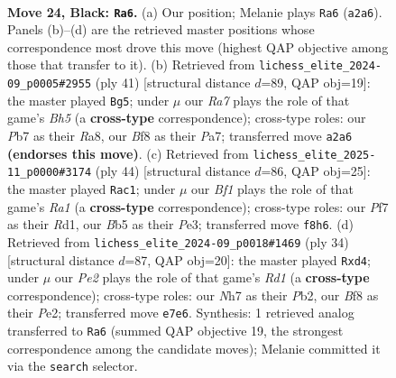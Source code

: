 \documentclass[11pt]{article}
\begin{document}
\begin{figure}[p]\centering
\begin{subfigure}{0.46\textwidth}\centering
\resizebox{\linewidth}{!}{%
\newchessgame
\chessboard[
  setfen={2k2b1r/1p2pp1n/1B1p2p1/1b6/3PP2Q/1P2RP2/r5PP/1K5R b - - 1 24},
  showmover=false,
  pgfstyle=straightmove, color=movearrow, markmove={a2-a6}
]}
\caption{}
\end{subfigure}\hfill
\begin{subfigure}{0.46\textwidth}\centering
\resizebox{\linewidth}{!}{%
\newchessgame
\chessboard[
  setfen={r5k1/pppb1pp1/7p/3p4/7b/2P2QP1/PP3P2/RN2rBK1 b - - 0 21},
  showmover=false,
  pgfstyle=straightmove, color=movearrow, markmove={h4-g5}
]}
\caption{}
\end{subfigure}
\\[4pt]
\begin{subfigure}{0.46\textwidth}\centering
\resizebox{\linewidth}{!}{%
\newchessgame
\chessboard[
  setfen={1r3k1r/5ppp/Q1B1pb2/1p2p3/1Pq5/P3P3/5PKP/R2R4 w - - 2 23},
  showmover=false,
  pgfstyle=straightmove, color=movearrow, markmove={a1-c1}
]}
\caption{}
\end{subfigure}\hfill
\begin{subfigure}{0.46\textwidth}\centering
\resizebox{\linewidth}{!}{%
\newchessgame
\chessboard[
  setfen={r1b2rk1/pp3pp1/2p4p/8/3q4/5BP1/PP2PP1P/R2R2K1 w - - 0 18},
  showmover=false,
  pgfstyle=straightmove, color=movearrow, markmove={d1-d4}
]}
\caption{}
\end{subfigure}
\caption{\textbf{Move 24, Black: \texttt{Ra6}.} (a) Our position; Melanie plays \texttt{Ra6} (\texttt{a2a6}). Panels (b)--(d) are the retrieved master positions whose correspondence most drove this move (highest QAP objective among those that transfer to it). (b) Retrieved from \texttt{lichess\_elite\_2024-09\_p0005\#2955} (ply 41) [structural distance $d$=89, QAP obj=19]: the master played \texttt{Bg5}; under $\mu$ our \emph{Ra7} plays the role of that game's \emph{Bh5} (a \textbf{cross-type} correspondence); cross-type roles: our \emph{P}b7 as their \emph{R}a8, our \emph{B}f8 as their \emph{P}a7; transferred move \texttt{a2a6} \textbf{(endorses this move)}. (c) Retrieved from \texttt{lichess\_elite\_2025-11\_p0000\#3174} (ply 44) [structural distance $d$=86, QAP obj=25]: the master played \texttt{Rac1}; under $\mu$ our \emph{Bf1} plays the role of that game's \emph{Ra1} (a \textbf{cross-type} correspondence); cross-type roles: our \emph{P}f7 as their \emph{R}d1, our \emph{B}b5 as their \emph{P}e3; transferred move \texttt{f8h6}. (d) Retrieved from \texttt{lichess\_elite\_2024-09\_p0018\#1469} (ply 34) [structural distance $d$=87, QAP obj=20]: the master played \texttt{Rxd4}; under $\mu$ our \emph{Pe2} plays the role of that game's \emph{Rd1} (a \textbf{cross-type} correspondence); cross-type roles: our \emph{N}h7 as their \emph{P}b2, our \emph{B}f8 as their \emph{P}e2; transferred move \texttt{e7e6}. Synthesis: 1 retrieved analog transferred to \texttt{Ra6} (summed QAP objective 19, the strongest correspondence among the candidate moves); Melanie committed it via the \texttt{search} selector.}
\label{fig:thought-m47}
\end{figure}
\end{document}
